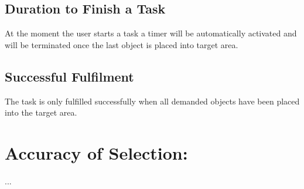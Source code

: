 \documentclass[a4paper, 12pt]{article}
\begin{document}
\subsection{Duration to Finish a Task}
At the moment the user starts a task a timer will be automatically activated and will be terminated once the last object is placed into target area. 

\subsection{Successful Fulfilment}
The task is only fulfilled successfully when all demanded objects have been placed into the target area. 

\section {Accuracy of Selection: }
...\cite{bowman1997evaluation}






\renewcommand{\refname}{References}

\end{document}
